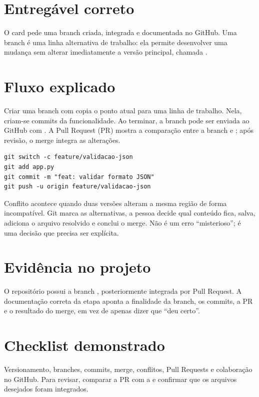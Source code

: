 \documentclass[11pt,a4paper]{article}
\begin{document}
\section*{Entregável correto}
O card pede uma branch criada, integrada e documentada no GitHub. Uma branch é uma linha alternativa de trabalho: ela permite desenvolver uma mudança sem alterar imediatamente a versão principal, chamada .
\section*{Fluxo explicado}
Criar uma branch com  copia o ponto atual para uma linha de trabalho. Nela, criam-se commits da funcionalidade. Ao terminar, a branch pode ser enviada ao GitHub com . A Pull Request (PR) mostra a comparação entre a branch e ; após revisão, o merge integra as alterações.
\begin{lstlisting}
git switch -c feature/validacao-json
git add app.py
git commit -m "feat: validar formato JSON"
git push -u origin feature/validacao-json
\end{lstlisting}
Conflito acontece quando duas versões alteram a mesma região de forma incompatível. Git marca as alternativas, a pessoa decide qual conteúdo fica, salva, adiciona o arquivo resolvido e conclui o merge. Não é um erro ``misterioso''; é uma decisão que precisa ser explícita.
\section*{Evidência no projeto}
O repositório possui a branch , posteriormente integrada por Pull Request. A documentação correta da etapa aponta a finalidade da branch, os commits, a PR e o resultado do merge, em vez de apenas dizer que ``deu certo''.
\section*{Checklist demonstrado}
Versionamento, branches, commits, merge, conflitos, Pull Requests e colaboração no GitHub. Para revisar, comparar a PR com a  e confirmar que os arquivos desejados foram integrados.
\end{document}
